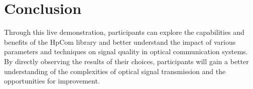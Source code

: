 \section{Conclusion}

Through this live demonstration, participants can explore the capabilities and benefits of the HpCom library and better understand the impact of various parameters and techniques on signal quality in optical communication systems. By directly observing the results of their choices, participants will gain a better understanding of the complexities of optical signal transmission and the opportunities for improvement.
